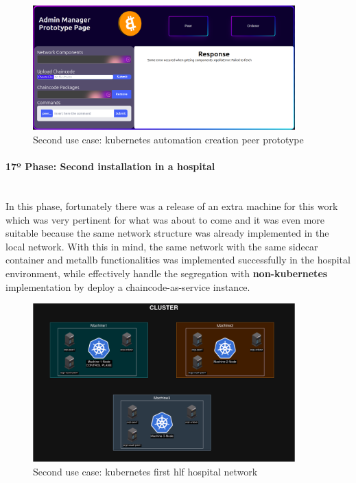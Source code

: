 \begin{figure}[H]
    \centering
    \includegraphics[width=0.9\textwidth]{assets/use-case-2/peer-manager-prototype-page.png} %
    \caption{Second use case: kubernetes automation creation peer prototype}
    \label{fig:sample-image} 
\end{figure}

\paragraph{17º Phase: Second installation in a hospital}\mbox{}\\
In this phase, fortunately there was a release of an extra machine for this work which was very pertinent for what was about to come and it was even more suitable because the same network structure was already implemented in the local network. With this in mind, the same network with the same sidecar container and metallb functionalities was implemented successfully in the hospital environment, while effectively handle the segregation with \textbf{non-kubernetes} implementation by deploy a chaincode-as-service instance.
\begin{figure}[H]
    \centering
    \includegraphics[width=0.9\textwidth]{assets/use-case-2/kubernetes-network.drawio.png} %
    \caption{Second use case: kubernetes first hlf hospital network}
    \label{fig:sample-image} 
\end{figure}

